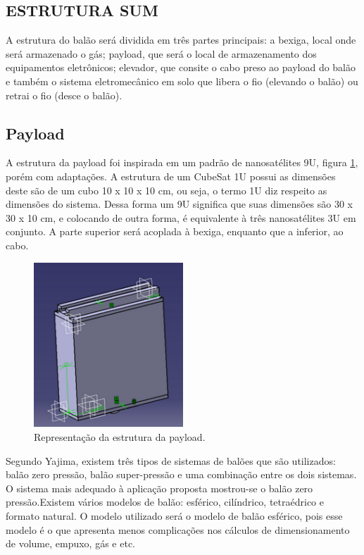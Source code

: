 \subsection{ESTRUTURA SUM}

   A estrutura do balão será dividida em três partes principais: a bexiga, local onde será armazenado o gás; payload, que será o local de armazenamento dos equipamentos eletrônicos; elevador, que consite o cabo preso ao payload do balão e também o sistema eletromecânico em solo que libera o fio (elevando o balão) ou retrai o fio (desce o balão).

\subsection{Payload}
  
    A estrutura da payload foi inspirada em um padrão de nanosatélites 9U, figura \ref{img:payload}, porém com adaptações. A estrutura de um CubeSat 1U possui as dimensões deste são de um cubo 10 x 10 x 10 cm, ou seja, o termo 1U diz respeito as dimensões do sistema. Dessa forma um 9U significa que suas dimensões são 30 x 30 x 10 cm, e colocando de outra forma, é equivalente à três nanosatélites 3U em conjunto. A parte superior será acoplada à bexiga, enquanto que a inferior, ao cabo.

  \begin{figure}[H]
    \centering
    \includegraphics[width=0.5\textwidth]{figuras/payload}
    \caption{Representação da estrutura da payload. }
    \label{img:payload}
  \end{figure}


    Segundo Yajima, existem três tipos de sistemas de balões que são utilizados: balão zero pressão, balão super-pressão e uma combinação entre os dois sistemas. O sistema mais adequado à aplicação proposta mostrou-se o balão zero pressão.Existem vários modelos de balão: esférico, cilíndrico, tetraédrico e formato natural. O modelo utilizado será o modelo de balão esférico, pois esse modelo é o que apresenta menos complicações nos cálculos de dimensionamento de volume, empuxo, gás e etc.

